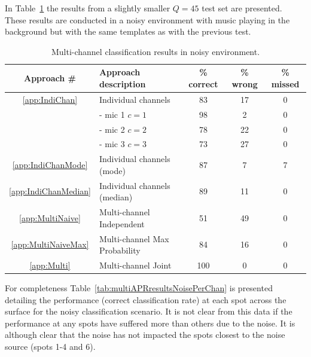 In Table~\ref{tab:multiAPRresultsNoise} the results from a slightly smaller $Q=45$ test set are presented. These results are conducted in a noisy environment with music playing in the background but with the same templates as with the previous test.

\begin{table}\begin{center}
\caption{Multi-channel classification results in noisy environment.}
\label{tab:multiAPRresultsNoise}
\begin{tabular}{|c|l|c|c|c|}\hline
Approach \#             & Approach description          & \% correct    & \% wrong  & \%  missed  \\ \hline
\ref{app:IndiChan}      & Individual channels           & 83            & 17        & 0           \\
                        &  - mic 1 $c = 1$              & 98            & 2         & 0           \\
                        &  - mic 2 $c = 2$              & 78            & 22        & 0           \\
                        &  - mic 3 $c = 3$              & 73            & 27        & 0           \\
\ref{app:IndiChanMode}  & Individual channels (mode)    & 87            & 7         & 7           \\
\ref{app:IndiChanMedian}& Individual channels (median)  & 89            & 11        & 0           \\
\ref{app:MultiNaive}    & Multi-channel Independent     & 51            & 49        & 0           \\
\ref{app:MultiNaiveMax} & Multi-channel Max Probability & 84            & 16        & 0           \\
\ref{app:Multi}         & Multi-channel Joint           & 100           & 0         & 0           \\ \hline
\end{tabular}\end{center}\end{table}

For completeness Table~\ref{tab:multiAPRresultsNoisePerChan} is presented detailing the performance (correct classification rate) at each spot across the surface for the noisy classification scenario. It is not clear from this data if the performance at any spots have suffered more than others due to the noise. It is although clear that the noise has not impacted the spots closest to the noise source (spots 1-4 and 6).

